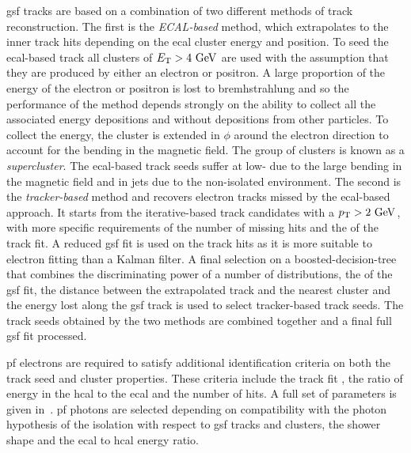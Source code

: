 \acrshort{gsf} tracks are based on a combination of two different methods of track reconstruction.
The first is the \textit{ECAL-based} method, which extrapolates to the inner track hits depending on the \acrshort{ecal} cluster energy and position.
To seed the \acrshort{ecal}-based track all clusters of $E_{\mathrm{T}}>4\mathrm{~Ge\hspace{-.08em}V}^{}$ are used with the assumption that they are produced by either an electron or positron.
A large proportion of the energy of the electron or positron is lost to bremhstrahlung and so the performance of the method depends strongly on the ability to collect all the associated energy depositions and without depositions from other particles.
To collect the energy, the cluster is extended in $\phi$ around the electron direction to account for the bending in the magnetic field.
The group of clusters is known as a \textit{supercluster}.
The \acrshort{ecal}-based track seeds suffer at low-\pt{} due to the large bending in the magnetic field and in jets due to the non-isolated environment.
The second is the \textit{tracker-based} method and recovers electron tracks missed by the \acrshort{ecal}-based approach.
It starts from the iterative-based track candidates with a $p_{\mathrm{T}}>2\mathrm{~Ge\hspace{-.08em}V}^{}$, with more specific requirements of the number of missing hits and the \chisq{} of the track fit.
A reduced \acrshort{gsf} fit is used on the track hits as it is more suitable to electron fitting than a Kalman filter.
A final selection on a boosted-decision-tree that combines the discriminating power of a number of distributions, \eg{} the \chisq{} of the \acrshort{gsf} fit, the distance between the extrapolated track and the nearest cluster and the energy lost along the \acrshort{gsf} track is used to select tracker-based track seeds.
The track seeds obtained by the two methods are combined together and a final full \acrshort{gsf} fit processed.

\acrshort{pf} electrons are required to satisfy additional identification criteria on both the track seed and cluster properties.
These criteria include the track fit \chisq{}, the ratio of energy in the \acrshort{hcal} to the \acrshort{ecal} and the number of hits.
A full set of parameters is given in~\cite{Event:PFlow}.
\acrshort{pf} photons are selected depending on compatibility with the photon hypothesis of the isolation with respect to \acrshort{gsf} tracks and clusters, the shower shape and the \acrshort{ecal} to \acrshort{hcal} energy ratio.



